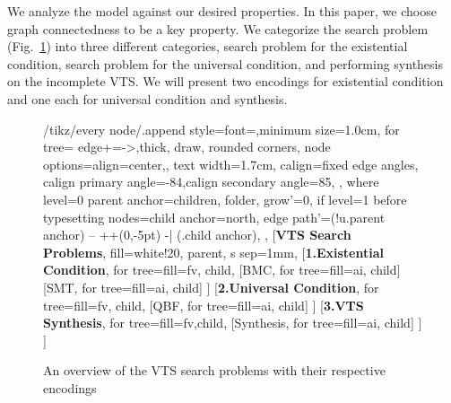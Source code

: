 \noindent %
We analyze the model against our desired properties.
%
%
In this paper, we choose graph connectedness to be a key property.
%
We categorize the search problem (Fig.~\ref{fig:vts-search}) into three different categories, search problem for the existential condition, search problem for the universal condition, and performing synthesis on the incomplete VTS. 
%
We will present two encodings for existential condition and one each for universal condition and synthesis.

\begin {figure}[!t]
\centering
\begin{adjustbox}{width=0.9\columnwidth}
	{\Large
		
		\begin{forest}
			/tikz/every node/.append style={font=\sffamily,minimum size=1.0cm},
			for tree={
				edge+={->,thick},%
				draw,
				rounded corners,
				node options={align=center,},
				text width=1.7cm,
				calign=fixed edge angles, calign primary angle=-84,calign secondary angle=85,
			},
			where level=0{%
				parent anchor=children,
			}{%
				folder,
				grow'=0,
				if level=1{%
					before typesetting nodes={child anchor=north},
					edge path'={(!u.parent anchor) -- ++(0,-5pt) -| (.child anchor)},
				}{},
			}
			[\textbf{VTS Search \\ Problems}, fill=white!20, parent, s sep=1mm,
			[\textbf{1.Existential Condition}, for tree={fill=fv, child}, 
			[BMC, for tree={fill=ai, child}]
			[SMT, for tree={fill=ai, child}]
			]
			[\textbf{2.Universal Condition}, for tree={fill=fv, child},
			[QBF, for tree={fill=ai, child}]
			]
			[\textbf{3.VTS Synthesis}, for tree={fill=fv,child}, 
			[Synthesis, for tree={fill=ai, child}]
			]
			]
		\end{forest}
	}
\end{adjustbox}
\vspace{0.01cm}


\caption{An overview of the VTS search problems with their respective encodings}
\label{fig:vts-search}
\end{figure}


